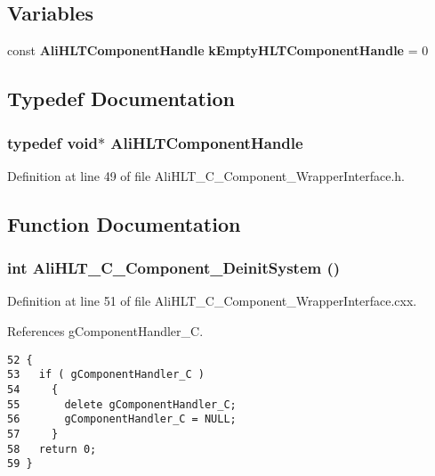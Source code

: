 \subsection*{Variables}
\begin{CompactItemize}
\item 
const {\bf Ali\-HLTComponent\-Handle} {\bf k\-Empty\-HLTComponent\-Handle} = 0
\end{CompactItemize}


\subsection{Typedef Documentation}
\subsubsection{\setlength{\rightskip}{0pt plus 5cm}typedef void$\ast$ {\bf Ali\-HLTComponent\-Handle}}\label{group__alihlt__wrapper__interface_ga0}




Definition at line 49 of file Ali\-HLT\_\-C\_\-Component\_\-Wrapper\-Interface.h.

\subsection{Function Documentation}
\subsubsection{\setlength{\rightskip}{0pt plus 5cm}int Ali\-HLT\_\-C\_\-Component\_\-Deinit\-System ()}\label{group__alihlt__wrapper__interface_ga3}




Definition at line 51 of file Ali\-HLT\_\-C\_\-Component\_\-Wrapper\-Interface.cxx.

References g\-Component\-Handler\_\-C.

\footnotesize\begin{verbatim}52 {
53   if ( gComponentHandler_C )
54     {
55       delete gComponentHandler_C;
56       gComponentHandler_C = NULL;
57     }
58   return 0;
59 }
\end{verbatim}\normalsize 


